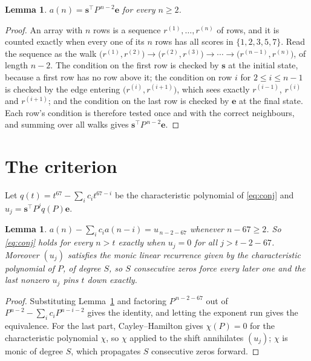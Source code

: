 \documentclass[11pt,a4paper]{article}
\theoremstyle{plain}
\newtheorem{lemma}[theorem]{Lemma}
\theoremstyle{definition}
\begin{document}
\begin{lemma}\label{lem:walk}
$a(n)=\mathbf{s}^{\!\top}P^{\,n-2}\mathbf{e}$ for every $n\ge2$.
\end{lemma}

\begin{proof}
An array with $n$ rows is a sequence $r^{(1)},\dots,r^{(n)}$ of rows, and it is counted
exactly when every one of its $n$ rows has all scores in $\{1,2,3,5,7\}$. Read the sequence as the
walk $\bigl(r^{(1)},r^{(2)}\bigr)\to\bigl(r^{(2)},r^{(3)}\bigr)\to\cdots\to
\bigl(r^{(n-1)},r^{(n)}\bigr)$, of length $n-2$. The condition on the first row is
checked by $\mathbf{s}$ at the initial state, because a first row has no row above it; the
condition on row $i$ for $2\le i\le n-1$ is checked by the edge entering
$\bigl(r^{(i)},r^{(i+1)}\bigr)$, which sees exactly $r^{(i-1)}$, $r^{(i)}$ and
$r^{(i+1)}$; and the condition on the last row is checked by $\mathbf{e}$ at the final
state. Each row's condition is therefore tested once and with the correct neighbours, and
summing over all walks gives $\mathbf{s}^{\!\top}P^{\,n-2}\mathbf{e}$.
\end{proof}

\section{The criterion}

Let $q(t)=t^{67}-\sum_i c_i t^{67-i}$ be the characteristic polynomial of
\eqref{eq:conj} and $u_j=\mathbf{s}^{\!\top}P^{j}q(P)\mathbf{e}$.

\begin{lemma}\label{lem:crit}
$a(n)-\sum_i c_i a(n-i)=u_{\,n-2-67}$ whenever $n-67\ge2$. So \eqref{eq:conj}
holds for every $n>t$ exactly when $u_j=0$ for all $j>t-2-67$. Moreover $(u_j)$
satisfies the monic linear recurrence given by the characteristic polynomial of $P$, of
degree $S$, so $S$ consecutive zeros force every later one and the last nonzero $u_j$ pins
$t$ down exactly.
\end{lemma}

\begin{proof}
Substituting Lemma~\ref{lem:walk} and factoring $P^{\,n-2-67}$ out of
$P^{n-2}-\sum_i c_i P^{n-i-2}$ gives the identity, and letting the exponent run gives the
equivalence. For the last part, Cayley--Hamilton gives $\chi(P)=0$ for the characteristic
polynomial $\chi$, so $\chi$ applied to the shift annihilates $(u_j)$; $\chi$ is monic of
degree $S$, which propagates $S$ consecutive zeros forward.
\end{proof}
\end{document}
